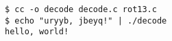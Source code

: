 \begin{verbatim}
$ cc -o decode decode.c rot13.c
$ echo "uryyb, jbeyq!" | ./decode
hello, world!
\end{verbatim}